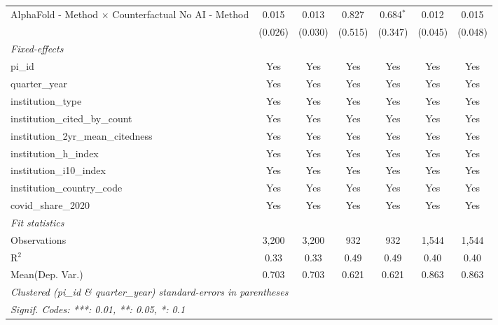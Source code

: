 \begin{tabular}{lcccccc}
   AlphaFold - Method $\times$ Counterfactual No AI - Method   & 0.015        & 0.013        & 0.827          & 0.684$^{*}$    & 0.012   & 0.015\\   
                                                               & (0.026)      & (0.030)      & (0.515)        & (0.347)        & (0.045) & (0.048)\\   
   \midrule
   \emph{Fixed-effects}\\
   pi\_id                                                      & Yes          & Yes          & Yes            & Yes            & Yes     & Yes\\  
   quarter\_year                                               & Yes          & Yes          & Yes            & Yes            & Yes     & Yes\\  
   institution\_type                                           & Yes          & Yes          & Yes            & Yes            & Yes     & Yes\\  
   institution\_cited\_by\_count                               & Yes          & Yes          & Yes            & Yes            & Yes     & Yes\\  
   institution\_2yr\_mean\_citedness                           & Yes          & Yes          & Yes            & Yes            & Yes     & Yes\\  
   institution\_h\_index                                       & Yes          & Yes          & Yes            & Yes            & Yes     & Yes\\  
   institution\_i10\_index                                     & Yes          & Yes          & Yes            & Yes            & Yes     & Yes\\  
   institution\_country\_code                                  & Yes          & Yes          & Yes            & Yes            & Yes     & Yes\\  
   covid\_share\_2020                                          & Yes          & Yes          & Yes            & Yes            & Yes     & Yes\\  
   \midrule
   \emph{Fit statistics}\\
   Observations                                                & 3,200        & 3,200        & 932            & 932            & 1,544   & 1,544\\  
   R$^2$                                                       & 0.33         & 0.33         & 0.49           & 0.49           & 0.40    & 0.40\\  
Mean(Dep. Var.) & 0.703 & 0.703 & 0.621 & 0.621 & 0.863 & 0.863 \\
   \midrule \midrule
   \multicolumn{7}{l}{\emph{Clustered (pi\_id \& quarter\_year) standard-errors in parentheses}}\\
   \multicolumn{7}{l}{\emph{Signif. Codes: ***: 0.01, **: 0.05, *: 0.1}}\\
\end{tabular}
\par\endgroup
